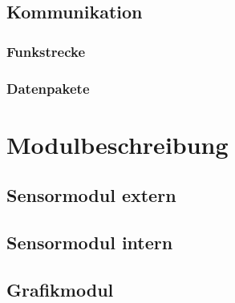 \documentclass[a4paper,11pt]{article}
\newcounter{subsubsubsection}[subsubsection]
\begin{document}
\label{subsubsubsub:meteotime}

\subsection{Kommunikation}
\label{subsub:kommunikation}

\subsubsection{Funkstrecke}
\label{subsubsub:funkstrecke}

\subsubsection{Datenpakete}
\label{subsubsub:datenpakete}

\section{Modulbeschreibung}
\label{sub:modulbeschreibung}

\subsection{Sensormodul extern}
\label{subsub:sensorModul_ext}

\subsection{Sensormodul intern}
\label{subsub:sensorModul_int}

\subsection{Grafikmodul}
\label{subsub:grafikmodul}
\end{document}
